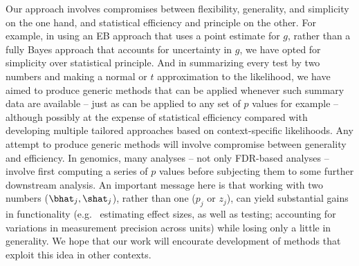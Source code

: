 Our approach involves compromises between flexibility, generality, and simplicity on the one hand, and statistical efficiency and principle on the other.
For example, in using an EB approach that uses a point estimate for $g$, rather than a fully Bayes approach that accounts for uncertainty in $g$,
we have opted for simplicity over statistical principle. And in summarizing every test by
two numbers and making a normal or $t$ approximation to the likelihood, we have aimed to produce generic methods that 
 can be applied whenever such summary data are available -- just as \qvalue can be applied to any set of $p$ values for example -- although
 possibly at the expense of statistical efficiency compared with developing multiple tailored approaches based on context-specific likelihoods. 
 Any attempt to produce generic methods will involve compromise between generality and efficiency.
 In genomics, many analyses -- not only FDR-based analyses -- involve first computing a series of $p$ values before
 subjecting them to some further downstream analysis. An important message here is 
 that working with two numbers ($\bhat_j,\shat_j$), rather than one ($p_j$ or $z_j$), 
 can yield substantial gains in functionality (e.g.~ estimating effect sizes, as well as testing; accounting for variations in
measurement precision across units) while losing only a little in generality.  We hope that our work will
encourate development of methods that exploit this idea in other contexts.